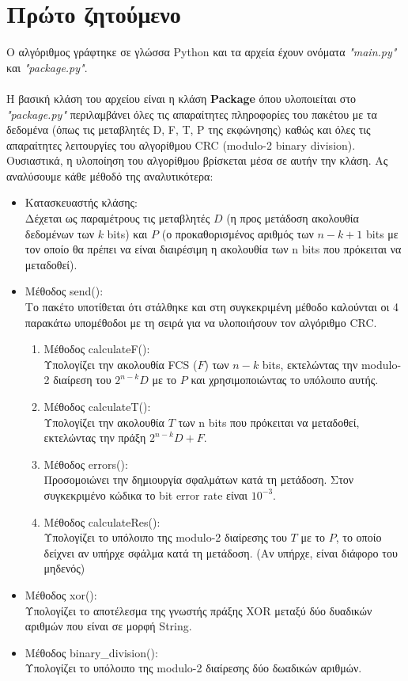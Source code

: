 \documentclass[12pt,a4paper]{article}
\begin{document}
\section{Πρώτο ζητούμενο}   %
Ο αλγόριθμος γράφτηκε σε γλώσσα Python και τα αρχεία έχουν ονόματα \textit{"main.py"} και \textit{"package.py"}.\\\\
Η βασική κλάση του αρχείου είναι η κλάση \textbf{Package} όπου υλοποιείται στο \textit{"package.py"} περιλαμβάνει όλες τις απαραίτητες πληροφορίες του πακέτου με τα δεδομένα (όπως τις μεταβλητές D, F, T, P της εκφώνησης) καθώς και όλες τις απαραίτητες λειτουργίες του αλγορίθμου CRC (modulo-2 binary division). Ουσιαστικά, η υλοποίηση του αλγορίθμου βρίσκεται μέσα σε αυτήν την κλάση. Ας αναλύσουμε κάθε μέθοδό της αναλυτικότερα:
\begin{itemize}
  \item Κατασκευαστής κλάσης:\\Δέχεται ως παραμέτρους τις μεταβλητές $D$ (η προς μετάδοση ακολουθία δεδομένων των $k$ bits) και $P$ (ο προκαθορισμένος αριθμός των $n-k+1$ bits με τον οποίο θα πρέπει να είναι διαιρέσιμη η ακολουθία των n bits που πρόκειται να μεταδοθεί).
  \item Μέθοδος send():\\Το πακέτο υποτίθεται ότι στάλθηκε και στη συγκεκριμένη μέθοδο καλούνται οι 4 παρακάτω υπομέθοδοι με τη σειρά για να υλοποιήσουν τον αλγόριθμο CRC.
  \begin{enumerate}
    \item Μέθοδος calculateF():\\Υπολογίζει την ακολουθία FCS ($F$) των $n-k$ bits, εκτελώντας την modulo-2 διαίρεση του $2^{n-k}D$ με το $P$ και χρησιμοποιώντας το υπόλοιπο αυτής.
    \item Μέθοδος calculateT():\\Υπολογίζει την ακολουθία $T$ των n bits που πρόκειται να μεταδοθεί, εκτελώντας την πράξη $2^{n-k}D+F$.
    \item Μέθοδος errors():\\Προσομοιώνει την δημιουργία σφαλμάτων κατά τη μετάδοση. Στον συγκεκριμένο κώδικα το bit error rate είναι $10^{-3}$.
    \item Μέθοδος calculateRes():\\Υπολογίζει το υπόλοιπο της modulo-2 διαίρεσης του $T$ με το $P$, το οποίο δείχνει αν υπήρχε σφάλμα κατά τη μετάδοση. (Αν υπήρχε, είναι διάφορο του μηδενός)
  \end{enumerate}
  \item Μέθοδος xor():\\Υπολογίζει το αποτέλεσμα της γνωστής πράξης XOR μεταξύ δύο δυαδικών αριθμών που είναι σε μορφή String.
  \item Μέθοδος binary\_division():\\Υπολογίζει το υπόλοιπο της modulo-2 διαίρεσης δύο δωαδικών αριθμών.
\end{itemize}
\end{document}
